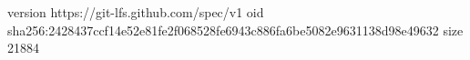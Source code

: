 version https://git-lfs.github.com/spec/v1
oid sha256:2428437ccf14e52e81fe2f068528fe6943c886fa6be5082e9631138d98e49632
size 21884
